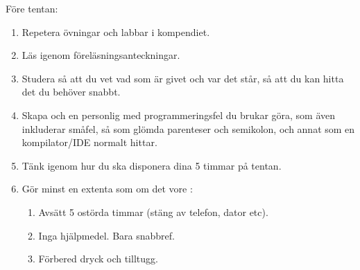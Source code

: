 









\begin{Slide}{Före tentan:}\SlideFontSmall
\begin{enumerate}
\item Repetera övningar och labbar i kompendiet.
\item Läs igenom föreläsningsanteckningar.
\item Studera   så att du vet vad som är givet och var det står, så att du kan hitta det du behöver snabbt.
\item Skapa och  en personlig  med programmeringsfel du brukar göra, som även inkluderar småfel, så som glömda parenteser och semikolon, och annat som en kompilator/IDE normalt hittar.
\item Tänk igenom hur du ska disponera dina 5 timmar på tentan.
\item Gör minst en extenta som om det vore :
\begin{enumerate}\SlideFontTiny
\item Avsätt 5 ostörda timmar (stäng av telefon, dator etc).
\item Inga hjälpmedel. Bara snabbref.
\item Förbered dryck och tilltugg.
\end{enumerate}
\end{enumerate}
\end{Slide}

